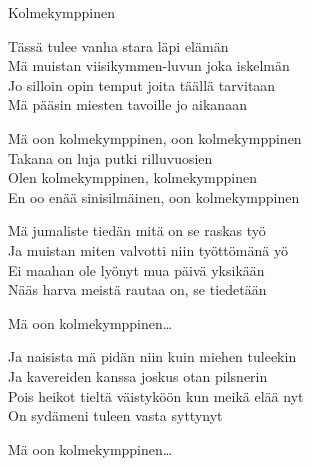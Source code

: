 \begin{song}{Kolmekymppinen}

    Tässä tulee vanha stara läpi elämän\\
    Mä muistan viisikymmen-luvun joka iskelmän\\
    Jo silloin opin temput joita täällä tarvitaan\\
    Mä pääsin miesten tavoille jo aikanaan

    Mä oon kolmekymppinen, oon kolmekymppinen\\
    Takana on luja putki rilluvuosien\\
    Olen kolmekymppinen, kolmekymppinen\\
    En oo enää sinisilmäinen, oon kolmekymppinen

    Mä jumaliste tiedän mitä on se raskas työ\\
    Ja muistan miten valvotti niin työttömänä yö\\
    Ei maahan ole lyönyt mua päivä yksikään\\
    Nääs harva meistä rautaa on, se tiedetään

    Mä oon kolmekymppinen\dots

    Ja naisista mä pidän niin kuin miehen tuleekin\\
    Ja kavereiden kanssa joskus otan pilsnerin\\
    Pois heikot tieltä väistyköön kun meikä elää nyt\\
    On sydämeni tuleen vasta syttynyt

    Mä oon kolmekymppinen\dots

\end{song}